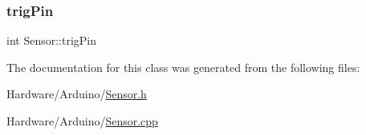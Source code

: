 \subsubsection{\texorpdfstring{trig\+Pin}{trigPin}}
{\footnotesize\ttfamily int Sensor\+::trig\+Pin\hspace{0.3cm}{\ttfamily [private]}}



The documentation for this class was generated from the following files\+:\begin{DoxyCompactItemize}
\item 
Hardware/\+Arduino/\mbox{\hyperlink{_hardware_2_arduino_2_sensor_8h}{Sensor.\+h}}\item 
Hardware/\+Arduino/\mbox{\hyperlink{_hardware_2_arduino_2_sensor_8cpp}{Sensor.\+cpp}}\end{DoxyCompactItemize}
